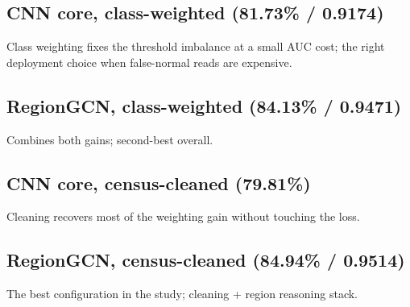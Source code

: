 \subsection{CNN core, class-weighted (81.73\% / 0.9174)}
Class weighting fixes the threshold imbalance at a small AUC cost; the
right deployment choice when false-normal reads are expensive.
\subsection{RegionGCN, class-weighted (84.13\% / 0.9471)}
Combines both gains; second-best overall.
\subsection{CNN core, census-cleaned (79.81\%)}
Cleaning recovers most of the weighting gain without touching the loss.
\subsection{RegionGCN, census-cleaned (84.94\% / 0.9514)}
The best configuration in the study; cleaning + region reasoning stack.
